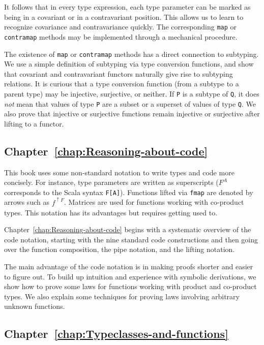 It follows that in every type expression, each type parameter can
be marked as being in a covariant or in a contravariant position.
This allows us to learn to recognize covariance and contravariance
quickly. The corresponding \lstinline!map! or \lstinline!contramap!
methods may be implemented through a mechanical procedure.

The existence of \lstinline!map! or \lstinline!contramap! methods
has a direct connection to subtyping. We use a simple definition of
subtyping via type conversion functions, and show that covariant and
contravariant functors naturally give rise to subtyping relations.
It is curious that a type conversion function (from a subtype to a
parent type) may be injective, surjective, or neither. If \lstinline!P!
is a subtype of \lstinline!Q!, it does \emph{not} mean that values
of type \lstinline!P! are a subset or a superset of values of type
\lstinline!Q!. We also prove that injective or surjective functions
remain injective or surjective after lifting to a functor. 

\subsection{Chapter~\ref{chap:Reasoning-about-code}}

This book uses some non-standard notation to write types and code
more concisely. For instance, type parameters are written as superscripts
($F^{A}$ corresponds to the Scala syntax \lstinline!F[A]!). Functions
lifted via \lstinline!fmap! are denoted by arrows such as $f^{\uparrow F}$.
Matrices are used for functions working with co-product types. This
notation has its advantages but requires getting used to.

Chapter~\ref{chap:Reasoning-about-code} begins with a systematic
overview of the code notation, starting with the nine standard code
constructions and then going over the function composition, the pipe
notation, and the lifting notation. 

The main advantage of the code notation is in making proofs shorter
and easier to figure out. To build up intuition and experience with
symbolic derivations, we show how to prove some laws for functions
working with product and co-product types. We also explain some techniques
for proving laws involving arbitrary unknown functions.

\subsection{Chapter~\ref{chap:Typeclasses-and-functions}}

